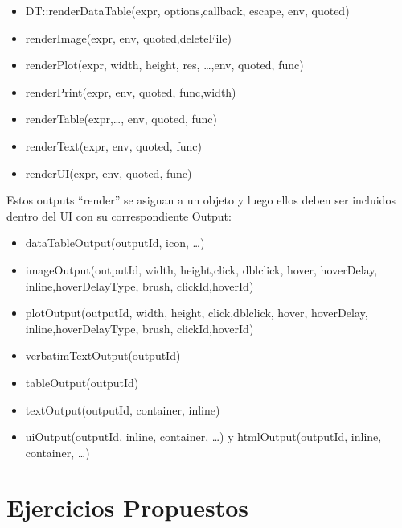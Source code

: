 \documentclass[
]{book}
\providecommand{\tightlist}{%
  \setlength{\itemsep}{0pt}\setlength{\parskip}{0pt}}
\begin{document}
\begin{itemize}
\tightlist
\item
  DT::renderDataTable(expr, options,callback, escape, env, quoted)
\item
  renderImage(expr, env, quoted,deleteFile)
\item
  renderPlot(expr, width, height, res, \ldots,env, quoted, func)
\item
  renderPrint(expr, env, quoted, func,width)
\item
  renderTable(expr,\ldots, env, quoted, func)
\item
  renderText(expr, env, quoted, func)
\item
  renderUI(expr, env, quoted, func)
\end{itemize}

Estos outputs ``render'' se asignan a un objeto y luego ellos deben ser incluidos dentro del UI con su correspondiente Output:

\begin{itemize}
\tightlist
\item
  dataTableOutput(outputId, icon, \ldots)
\item
  imageOutput(outputId, width, height,click, dblclick, hover, hoverDelay, inline,hoverDelayType, brush, clickId,hoverId)
\item
  plotOutput(outputId, width, height, click,dblclick, hover, hoverDelay, inline,hoverDelayType, brush, clickId,hoverId)
\item
  verbatimTextOutput(outputId)
\item
  tableOutput(outputId)
\item
  textOutput(outputId, container, inline)
\item
  uiOutput(outputId, inline, container, \ldots) y htmlOutput(outputId, inline, container, \ldots)
\end{itemize}

\hypertarget{ejercicios-propuestos}{%
\section{Ejercicios Propuestos}\label{ejercicios-propuestos}}
\end{document}
